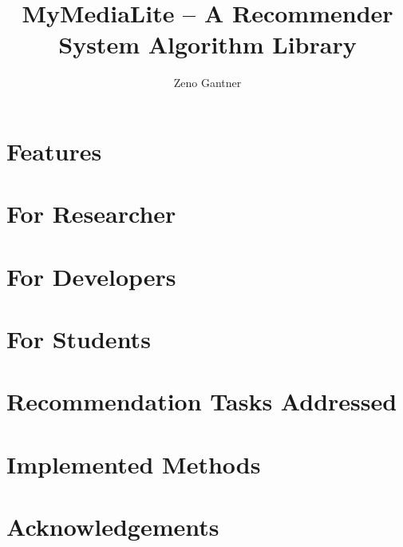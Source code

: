 \documentclass[a4]{leaflet}
\title{MyMediaLite -- A Recommender System Algorithm Library}
\author{Zeno Gantner}
\begin{document}
\section{Features}

\section{For Researcher}

\section{For Developers}

\section{For Students}

\section{Recommendation Tasks Addressed}

\section{Implemented Methods}

\section{Acknowledgements}
\end{document}
